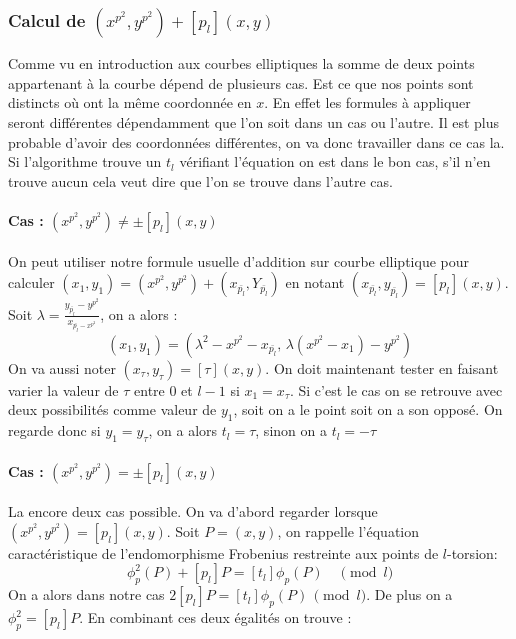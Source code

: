 \documentclass{article}
\begin{document}
\subsubsection{Calcul de $(x^{p^2}, y^{p^2}) + [p_l](x,y)$}

Comme vu en introduction aux courbes elliptiques la somme de deux points appartenant à la courbe dépend de plusieurs cas. Est ce que nos points sont distincts où ont la même coordonnée en $x$. En effet les formules à appliquer seront différentes dépendamment que l'on soit dans un cas ou l'autre. Il est plus probable d'avoir des coordonnées différentes, on va donc travailler dans ce cas la. Si l'algorithme trouve un $t_l$ vérifiant l'équation on est dans le bon cas, s'il n'en trouve aucun cela veut dire que l'on se trouve dans l'autre cas.
\paragraph*{Cas : $(x^{p^2}, y^{p^2}) \ne \pm [p_l](x,y)$}

On peut utiliser notre formule usuelle d'addition sur courbe elliptique pour calculer $(x_1, y_1) = (x^{p^2}, y^{p^2}) + (x_{\bar{p_l}}, Y_{\bar{p_l}})$ en notant $(x_{\bar{p_l}}, y_{\bar{p_l}}) =  [p_l](x,y)$. 
\newline
Soit $\lambda = \frac{y_{\bar{p_l}} - y^{p^2}}{x_{\bar{p_l} - x^{p^2}}}$, on a alors :
\begin{equation}
(x_1, y_1) = (\lambda^2 - x^{p^2} - x_{\bar{p_l}}, \, \lambda (x^{p^2} - x_1) -  y^{p^2})
\end{equation}
On va aussi noter $(x_{\tau}, y_{\tau}) =  [\tau](x,y)$. On doit maintenant tester en faisant varier la valeur de $\tau$ entre $0$ et $l -1$ si $x_1 = x_{\tau}$. Si c'est le cas on se retrouve avec deux possibilités comme valeur de $y_1$, soit on a le point soit on a son opposé. On regarde donc si $y_1 = y_{\tau}$, on a alors $t_l = \tau$, sinon on a $t_l = - \tau$

\paragraph*{Cas : $(x^{p^2}, y^{p^2}) = \pm [p_l](x,y)$}
La encore deux cas possible. On va d'abord regarder lorsque $(x^{p^2}, y^{p^2}) = [p_l](x,y)$. 
\newline
Soit $P=(x,y)$, on rappelle l’équation caractéristique de l'endomorphisme Frobenius restreinte aux points de $l$-torsion: 
\begin{equation}
\phi_p^2(P)  + [p_l]P = [t_{l}] \phi_p(P) \quad \pmod{l}
\end{equation}
On a alors dans notre cas $2[p_l]P = [t_{l}] \phi_p(P) \, \pmod{l}$. De plus on a $\phi_p^2 = [p_l]P$. En combinant ces deux égalités on trouve :
\end{document}

